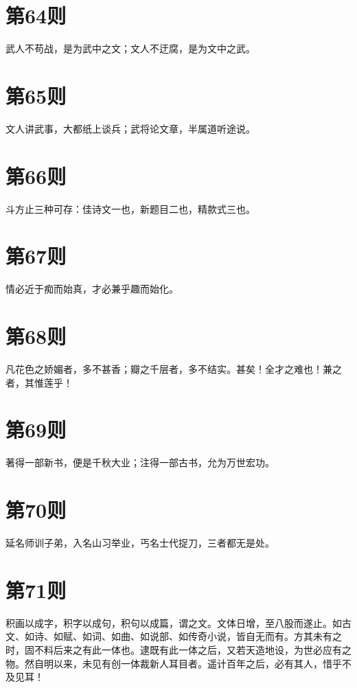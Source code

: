 \documentclass[12pt,a4paper]{ctexbook}
\begin{document}
\section{第64则}
武人不苟战，是为武中之文；文人不迂腐，是为文中之武。\par

\section{第65则}
文人讲武事，大都纸上谈兵；武将论文章，半属道听途说。\par

\section{第66则}
斗方止三种可存：佳诗文一也，新题目二也，精款式三也。\par

\section{第67则}
情必近于痴而始真，才必兼乎趣而始化。\par

\section{第68则}
凡花色之娇媚者，多不甚香；瓣之千层者，多不结实。甚矣！全才之难也！兼之者，其惟莲乎！\par

\section{第69则}
著得一部新书，便是千秋大业；注得一部古书，允为万世宏功。\par

\section{第70则}
延名师训子弟，入名山习举业，丐名士代捉刀，三者都无是处。\par

\section{第71则}
积画以成字，积字以成句，积句以成篇，谓之文。文体日增，至八股而遂止。如古文、如诗、如赋、如词、如曲、如说部、如传奇小说，皆自无而有。方其未有之时，固不料后来之有此一体也。逮既有此一体之后，又若天造地设，为世必应有之物。然自明以来，未见有创一体裁新人耳目者。遥计百年之后，必有其人，惜乎不及见耳！\par
\end{document}

